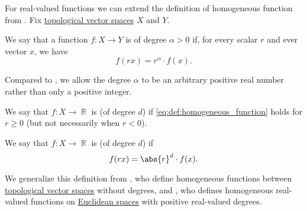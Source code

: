 \begin{definition}\label{def:real_homogeneous_function}\mimprovised
  For real-valued functions we can extend the definition of homogeneous function from . Fix \hyperref[def:topological_vector_space]{topological vector spaces} \( X \) and \( Y \).

  We say that a function \( f: X \to Y \) is  of degree \( \alpha > 0 \) if, for every scalar \( r \) and ever vector \( x \), we have
  \begin{equation}\label{eq:def:real_homogeneous_function}
    f(rx) = r^\alpha \cdot f(x).
  \end{equation}

  Compared to , we allow the degree \( \alpha \) to be an arbitrary positive real number rather than only a positive integer.

  \begin{thmenum}
     We say that \( f: X \to \BbbR \) is  (of degree \( d \)) if \eqref{eq:def:homogeneous_function} holds for \( r \geq 0 \) (but not necessarily when \( r < 0 \)).

     We say that \( f: X \to \BbbR \) is  (of degree \( d \)) if
    \begin{equation}\label{eq:def:real_homogeneous_function/absolute}
      f(rx) = \abs{r}^d \cdot f(x).
    \end{equation}
  \end{thmenum}
\end{definition}
\begin{comments}
  \item We generalize this definition from , who define homogeneous functions between \hyperref[def:topological_vector_space]{topological vector spaces} without degrees, and , who defines homogeneous real-valued functions on \hyperref[def:euclidean_space]{Euclidean spaces} with positive real-valued degrees.
\end{comments}

